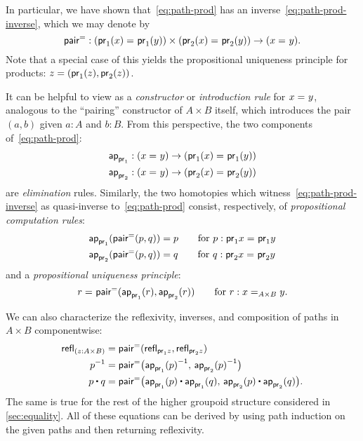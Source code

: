 In particular, we have shown that~\eqref{eq:path-prod} has an inverse~\eqref{eq:path-prod-inverse}, which we may denote by
\[
\pairpath : (\id{\proj{1}(x)}{\proj{1}(y)}) \times (\id{\proj{2}(x)}{\proj{2}(y)}) \to (\id x y).
\]
Note that a special case of this yields the propositional uniqueness principle for products: $z = (\proj1(z),\proj2(z))$.

It can be helpful to view \pairpath as a \emph{constructor} or \emph{introduction rule} for $\id x y$, analogous to the ``pairing'' constructor of $A\times B$ itself, which introduces the pair $(a,b)$ given $a:A$ and $b:B$.
From this perspective, the two components of~\eqref{eq:path-prod}:
\begin{align*}
  \projpath{1} &: (\id{x}{y}) \to (\id{\proj{1}(x)}{\proj{1} (y)})\\
  \projpath{2} &: (\id{x}{y}) \to (\id{\proj{2}(x)}{\proj{2} (y)})
\end{align*}
are \emph{elimination} rules.
Similarly, the two homotopies which witness~\eqref{eq:path-prod-inverse} as quasi-inverse to~\eqref{eq:path-prod} consist, respectively, of \emph{propositional computation rules}:
%
\begin{align*}
  {\projpath{1}{(\pairpath(p, q)})}
  &= %
  {p} \qquad\text{for } p:\id{\proj{1} x}{\proj{1} y} \\
  {\projpath{2}{(\pairpath(p,q)})}
  &= %
  {q} \qquad\text{for } q:\id{\proj{2} x}{\proj{2} y}
\end{align*}
and a \emph{propositional uniqueness principle}:
%
\[
\id{r}{\pairpath(\projpath{1} (r), \projpath{2} (r)) }
\qquad\text{for } r : \id[A \times B] x y.
\]

We can also characterize the reflexivity, inverses, and composition of paths in $A\times B$ componentwise:
\begin{align*}
  {\refl{(z : A \times B)}}
  &= {\pairpath (\refl{\proj{1} z},\refl{\proj{2} z})} \\
  {\opp{p}}
  &= {\pairpath \big(\opp{\projpath{1} (p)},\, \opp{\projpath{2} (p)}\big)} \\
  {{p \ct q}}
  &= {\pairpath \big({\projpath{1} (p)} \ct {\projpath{1} (q)},\,{\projpath{2} (p)} \ct {\projpath{2} (q)}\big)}.
\end{align*}
The same is true for the rest of the higher groupoid structure considered in \autoref{sec:equality}.
All of these equations can be derived by using path induction on the given paths and then returning reflexivity.  

